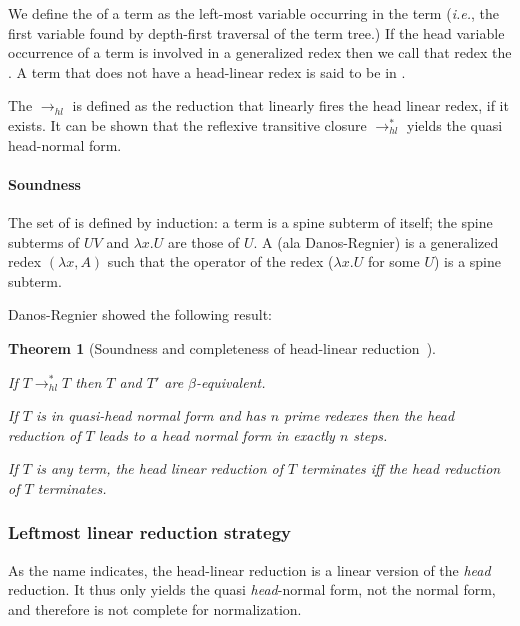 \documentclass{article}
\makeatletter
\theoremstyle{plain}
\newtheorem{theorem}{Theorem}[section]
\theoremstyle{definition}
\theoremstyle{remark}
\renewcommand\ie{{\it i.e.\@\xspace}}
\makeatother
\begin{document}
We define the  of a term as the left-most variable occurring in the term (\ie, the first variable found by depth-first traversal of the term tree.) If the head variable occurrence of a term is involved in a generalized redex then we call that redex the .
A term that does not have a head-linear redex is said to be in .

The  $\rightarrow_{hl}$ is defined as the reduction that linearly fires the head linear redex, if it exists. It can be shown that the reflexive transitive closure $\rightarrow^*_{hl}$ yields the quasi head-normal form.

\paragraph{Soundness}
The set of  is defined by induction: a term is a spine subterm of itself; the spine subterms of $U V$ and $\lambda x. U$ are those of $U$.
A  (ala Danos-Regnier) is a generalized redex $(\lambda x, A)$ such that the operator of the redex ($\lambda x . U$ for some $U$) is a spine subterm.

Danos-Regnier showed the following result:
\begin{theorem}[Soundness and completeness of head-linear reduction~\cite{danos-head}]
\label{thm:danosreigner_headlinred}
\begin{compactitem}
\item If $T \rightarrow^*_{hl} T$  then $T$ and $T'$ are $\beta$-equivalent.
\item If $T$ is in quasi-head normal form and has $n$ prime redexes then the head reduction of $T$ leads to a head normal form in exactly $n$ steps.
\item If $T$ is any term, the head linear reduction of $T$ terminates iff the head reduction of $T$ terminates.
\end{compactitem}
\end{theorem}

\subsubsection{Leftmost linear reduction strategy}

As the name indicates, the head-linear reduction is a linear version of the \emph{head} reduction. It thus only yields the quasi \emph{head}-normal form, not the normal form, and therefore is not complete for normalization.
\end{document}
